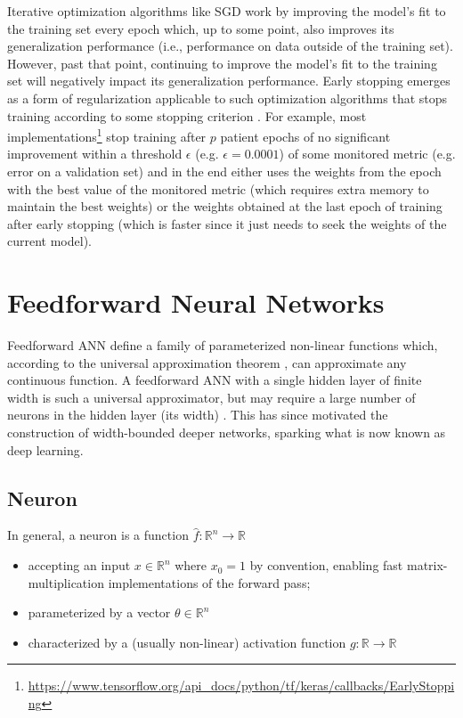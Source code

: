 Iterative optimization algorithms like \ac{SGD} work by improving the model's fit to the training set every epoch which, up to some point, also improves its generalization performance (i.e., performance on data outside of the training set). However, past that point, continuing to improve the model's fit to the training set will negatively impact its generalization performance. Early stopping emerges as a form of regularization applicable to such optimization algorithms that stops training according to some stopping criterion \cite{earlystopping} \cite{deeplearning}. For example, most implementations\footnote{\url{https://www.tensorflow.org/api_docs/python/tf/keras/callbacks/EarlyStopping}} stop training after $p$ patient epochs of no significant improvement within a threshold $\epsilon$ (e.g. $\epsilon = 0.0001$) of some monitored metric (e.g. error on a validation set) and in the end either uses the weights from the epoch with the best value of the monitored metric (which requires extra memory to maintain the best weights) or the weights obtained at the last epoch of training after early stopping (which is faster since it just needs to seek the weights of the current model).

\section{Feedforward Neural Networks}

Feedforward \ac{ANN} define a family of parameterized non-linear functions which, according to the universal approximation theorem \cite{uat}, can approximate any continuous function. A feedforward \ac{ANN} with a single hidden layer of finite width is such a universal approximator, but may require a large number of neurons in the hidden layer (its width) \cite{uat}. This has since motivated the construction of width-bounded deeper networks, sparking what is now known as deep learning.

\subsection{Neuron}

In general, a neuron is a function $\hat{f} \colon \mathbb{R}^n \to \mathbb{R}$

\begin{itemize}
    \item accepting an input $x \in \mathbb{R}^{n}$ where $x_0 = 1$ by convention, enabling fast matrix-multiplication implementations of the forward pass;
    \item parameterized by a vector $\theta \in \mathbb{R}^{n}$
    \item characterized by a (usually non-linear) activation function $g \colon \mathbb{R} \to \mathbb{R}$
\end{itemize}

